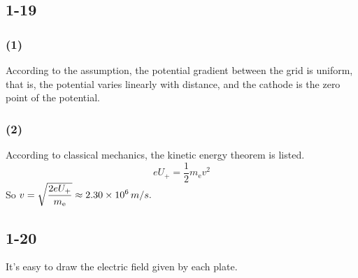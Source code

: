 \documentclass[a4paper,11pt]{amsart}
\theoremstyle{definition}
\begin{document}
	\begin{minipage}{0.5\textwidth}
		\subsection*{1-19}
		\subsubsection*{(1)}
		According to the assumption, the potential gradient between the grid is uniform, that is, the potential varies linearly with distance, and the cathode is the zero point of the potential.
	\end{minipage}
	\begin{minipage}{0.5\textwidth}
		\centering
	\end{minipage}
	\subsubsection*{(2)}
	According to classical mechanics, the kinetic energy theorem is listed.
	\begin{equation*}
		eU_+=\frac{1}{2}m_{\mathrm{e}}v^2
	\end{equation*}
	So $\displaystyle v=\sqrt{\dfrac{2eU_+}{m_\mathrm{e}}}\approx 2.30\times10^6\thinspace m/s.$
	
	\subsection*{1-20}
	It's easy to draw the electric field given by each plate.
	
\end{document}
